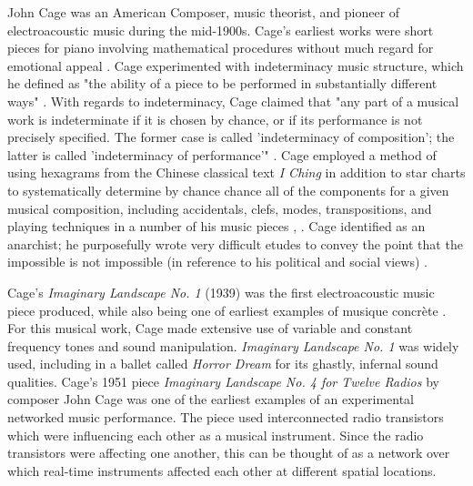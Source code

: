 \documentclass[letterpaper, 12pt]{article}
\begin{document}
%
John Cage was an American Composer, music theorist, and pioneer of electroacoustic music during the mid-1900s.
%
Cage's earliest works were short pieces for piano involving mathematical procedures without much regard for emotional appeal \citep{pritchett1996music}.
%
Cage experimented with indeterminacy music structure, which he defined as "the ability of a piece to be performed in substantially different ways" \citep{pritchett1996music}.
%
With regards to indeterminacy, Cage claimed that "any part of a musical work is indeterminate if it is chosen by chance, or if its performance is not precisely specified. The former case is called 'indeterminacy of composition'; the latter is called 'indeterminacy of performance'" \citep{simms1996music}.
%
Cage employed a method of using hexagrams from the Chinese classical text \textit{I Ching} in addition to star charts to systematically determine by chance chance all of the components for a given musical composition, including accidentals, clefs, modes, transpositions, and playing techniques in a number of his music pieces \citep{kostelanetz2003conversing}, \citep{nicholls2002cambridge}.
%
Cage identified as an anarchist; he purposefully wrote very difficult etudes to convey the point that the impossible is not impossible (in reference to his political and social views) \citep{perloff1994john}.

%
Cage's \textit{Imaginary Landscape No. 1} (1939) was the first electroacoustic music piece produced, while also being one of earliest examples of musique concrète \citep{silverman2012begin}.
%
For this musical work, Cage made extensive use of variable and constant frequency tones and sound manipulation.
%
\textit{Imaginary Landscape No. 1} was widely used, including in a ballet called \textit{Horror Dream} for its ghastly, infernal sound qualities.
%
Cage's 1951 piece \textit{Imaginary Landscape No. 4 for Twelve Radios} by composer John Cage was one of the earliest examples of an experimental networked music performance.
%
The piece used interconnected radio transistors which were influencing each other as a musical instrument.
%
Since the radio transistors were affecting one another, this can be thought of as a network over which real-time instruments affected each other at different spatial locations.

\end{document}
